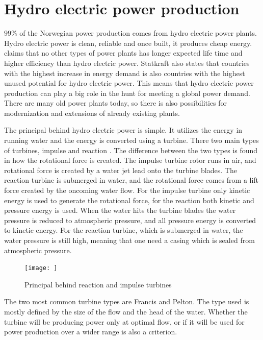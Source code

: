 \section{Hydro electric power production}\label{ref:sec_hydropower}
    $99\%$ of the Norwegian power production comes from hydro electric power plants. Hydro electric power is clean, reliable and once built, it produces cheap energy. \cite{Statkraft2009} claims that no other types of power plants has longer expected life time and higher efficiency than hydro electric power. Statkraft also states that countries with the highest increase in energy demand is also countries with the highest unused potential for hydro electric power. This means that hydro electric power production can play a big role in the hunt for meeting a global power demand. There are many old power plants today, so there is also possibilities for modernization and extensions of already existing plants. 
    
    The principal behind hydro electric power is simple. It utilizes the energy in running water and the energy is converted using a turbine. There two main types of turbines, impulse and reaction \cite{Paish2002}. The difference between the two types is found in how the rotational force is created. The impulse turbine rotor runs in air, and rotational force is created by a water jet lead onto the turbine blades. The reaction turbine is submerged in water, and the rotational force comes from a lift force created by the oncoming water flow. For the impulse turbine only kinetic energy is used to generate the rotational force, for the reaction both kinetic and pressure energy is used. When the water hits the turbine blades the water pressure is reduced to atmospheric pressure, and all pressure energy is converted to kinetic energy. For the reaction turbine, which is submerged in water, the water pressure is still high, meaning that one need a casing which is sealed from atmospheric pressure. 
    
    \begin{figure}
        \centering
        \texttt{[image: ]}
        \caption{Principal behind reaction and impulse turbines}
        \label{fig:my_label}
    \end{figure}
    
    
    The two most common turbine types are Francis and Pelton. The type used is mostly defined by the size of the flow and the head of the water. Whether the turbine will be producing power only at optimal flow, or if it will be used for power production over a wider range is also a criterion. 
    
